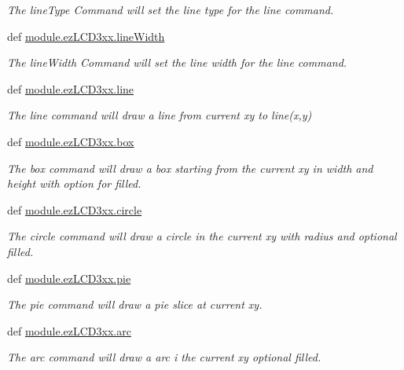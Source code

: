 \begin{DoxyCompactItemize}
\begin{DoxyCompactList}\small\item\em The line\-Type Command will set the line type for the line command. \end{DoxyCompactList}\item 
def \hyperlink{group___drawing_ga4a128e755251c2605c984110eb056fad}{module.\-ez\-L\-C\-D3xx.\-line\-Width}
\begin{DoxyCompactList}\small\item\em The line\-Width Command will set the line width for the line command. \end{DoxyCompactList}\item 
def \hyperlink{group___drawing_ga4ea7514be57c8e20f3d15fa14cf2ddf4}{module.\-ez\-L\-C\-D3xx.\-line}
\begin{DoxyCompactList}\small\item\em The line command will draw a line from current xy to line(x,y) \end{DoxyCompactList}\item 
def \hyperlink{group___drawing_gad107700161c2d7c46ed973ada854c9a0}{module.\-ez\-L\-C\-D3xx.\-box}
\begin{DoxyCompactList}\small\item\em The box command will draw a box starting from the current xy in width and height with option for filled. \end{DoxyCompactList}\item 
def \hyperlink{group___drawing_ga5820b906de6cabef82914dfab0c543e2}{module.\-ez\-L\-C\-D3xx.\-circle}
\begin{DoxyCompactList}\small\item\em The circle command will draw a circle in the current xy with radius and optional filled. \end{DoxyCompactList}\item 
def \hyperlink{group___drawing_gadc61344b718ac7728cad63f85a9712d5}{module.\-ez\-L\-C\-D3xx.\-pie}
\begin{DoxyCompactList}\small\item\em The pie command will draw a pie slice at current xy. \end{DoxyCompactList}\item 
def \hyperlink{group___drawing_gac515d84e432747e244699747380556ea}{module.\-ez\-L\-C\-D3xx.\-arc}
\begin{DoxyCompactList}\small\item\em The arc command will draw a arc i the current xy optional filled. \end{DoxyCompactList}\item 

\end{DoxyCompactItemize}
